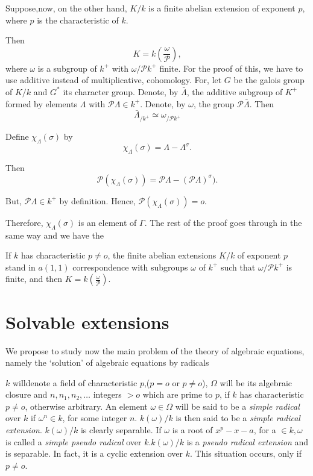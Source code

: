 Suppose,\pageoriginale now, on the other hand, $K/k$ is a finite
abelian extension of exponent $p$, where $p$ is the characteristic of
$k$.  

Then
$$
K= k (\frac{\omega}{\mathscr{P}}),
$$
where $\omega$ is a subgroup of $k^+$ with $\omega/\mathscr{P} k^+$
finite. For the proof of this, we have to use additive instead of
multiplicative, cohomology. For, let $G$ be the galois group of $K/k$
and $G^\ast$ its character group. Denote, by $\bar{\Lambda}$, the additive
subgroup of $K^+$ formed by elements $\Lambda$ with $\mathscr{P}
\Lambda \in k^+$. Denote, by $\omega$, the group $\mathscr{P}
\bar{\Lambda}$. Then  
$$
\bar{\Lambda}_{/k^+} \simeq \omega_{/ \mathscr{P} k^+}
$$

Define $\chi_{\Lambda}(\sigma)$ by 
$$
\chi_{\Lambda}(\sigma) = \Lambda- \Lambda^{\sigma}.
$$

Then
$$
\mathscr{P}(\chi_{\Lambda}(\sigma)) =  \mathscr{P} \Lambda
-(\mathscr{P} \Lambda)^{\sigma}). 
$$

But, $\mathscr{P} \Lambda \in k^+$ by
definition. Hence, $\mathscr{P}(\chi_{\Lambda}(\sigma))=o$. 

Therefore, $\chi_{\Lambda}(\sigma)$ is an element of $\Gamma$. The rest
of the proof goes through in the same way and we have the  

\begin{thm}\label{c6:thm15} %
 If $k$ has characteristic $p \neq o$, the finite abelian
  extensions $K/k$ of exponent $p$ stand in $a(1,1)$ correspondence
  with subgroups $\omega$ of $k^+$ such that $\omega/ \mathscr{P} k^+$
  is finite, and then $K = k(\frac{\omega}{\mathscr{P}})$.
\end{thm}


\section{Solvable extensions}\label{c6:s8}%

We propose to study now the main problem of the theory of algebraic
equations, namely the `solution' of algebraic equations by radicals  
 
$k$ will\pageoriginale denote a field of characteristic $p$,($p=o$ or
$p \neq o$), 
$\Omega$ will be its algebraic closure and $n,n_1,n_2, \ldots$ integers
$>o$ which are prime to $p$, if $k$ has characteristic $p \neq o$,
otherwise arbitrary. An element $\omega \in \Omega$ will be said to
be a \textit{simple radical} over $k$ if $\omega^n \in k$, for some
integer $n$. $k(\omega)/k$ is then said to be a \textit{simple radical
  extension}. $k(\omega)/k$ is clearly separable. If $\omega$ is a
root of $x^p-x-a$, for a $\in k, \omega$ is called a \textit{simple
  pseudo radical} over $k.k(\omega)/k$ is a \textit{pseudo radical
  extension} and is separable. In fact, it is a cyclic extension over
$k$. This situation occurs, only if $p \neq o$.  

